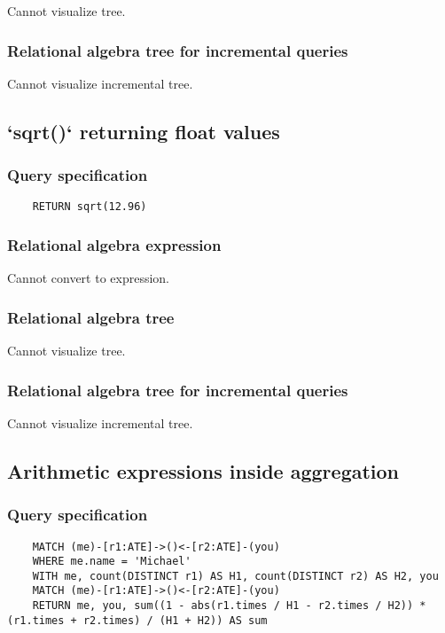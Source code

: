 	Cannot visualize tree.

	\subsubsection*{Relational algebra tree for incremental queries}

	Cannot visualize incremental tree.
	\subsection{`sqrt()` returning float values}

	\subsubsection*{Query specification}

	\begin{lstlisting}
	RETURN sqrt(12.96)
	\end{lstlisting}


	\subsubsection*{Relational algebra expression}

	Cannot convert to expression.

	\subsubsection*{Relational algebra tree}

	Cannot visualize tree.

	\subsubsection*{Relational algebra tree for incremental queries}

	Cannot visualize incremental tree.
	\subsection{Arithmetic expressions inside aggregation}

	\subsubsection*{Query specification}

	\begin{lstlisting}
	MATCH (me)-[r1:ATE]->()<-[r2:ATE]-(you)
	WHERE me.name = 'Michael'
	WITH me, count(DISTINCT r1) AS H1, count(DISTINCT r2) AS H2, you
	MATCH (me)-[r1:ATE]->()<-[r2:ATE]-(you)
	RETURN me, you, sum((1 - abs(r1.times / H1 - r2.times / H2)) * (r1.times + r2.times) / (H1 + H2)) AS sum
	\end{lstlisting}


